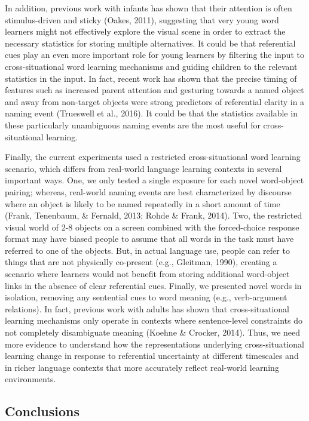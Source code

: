 \documentclass[authoryear, review]{elsarticle}
\begin{document}
In addition, previous work with infants has shown that their attention
is often stimulus-driven and sticky (Oakes, 2011), suggesting that very
young word learners might not effectively explore the visual scene in
order to extract the necessary statistics for storing multiple
alternatives. It could be that referential cues play an even more
important role for young learners by filtering the input to
cross-situational word learning mechanisms and guiding children to the
relevant statistics in the input. In fact, recent work has shown that
the precise timing of features such as increased parent attention and
gesturing towards a named object and away from non-target objects were
strong predictors of referential clarity in a naming event (Trueswell et
al., 2016). It could be that the statistics available in these
particularly unambiguous naming events are the most useful for
cross-situational learning.

Finally, the current experiments used a restricted cross-situational
word learning scenario, which differs from real-world language learning
contexts in several important ways. One, we only tested a single
exposure for each novel word-object pairing; whereas, real-world naming
events are best characterized by discourse where an object is likely to
be named repeatedly in a short amount of time (Frank, Tenenbaum, \&
Fernald, 2013; Rohde \& Frank, 2014). Two, the restricted visual world
of 2-8 objects on a screen combined with the forced-choice response
format may have biased people to assume that all words in the task must
have referred to one of the objects. But, in actual language use, people
can refer to things that are not physically co-present (e.g., Gleitman,
1990), creating a scenario where learners would not benefit from storing
additional word-object links in the absence of clear referential cues.
Finally, we presented novel words in isolation, removing any sentential
cues to word meaning (e.g., verb-argument relations). In fact, previous
work with adults has shown that cross-situational learning mechanisms
only operate in contexts where sentence-level constraints do not
completely disambiguate meaning (Koehne \& Crocker, 2014). Thus, we need
more evidence to understand how the representations underlying
cross-situational learning change in response to referential uncertainty
at different timescales and in richer language contexts that more
accurately reflect real-world learning environments.

\subsection{Conclusions}\label{conclusions}
\end{document}
